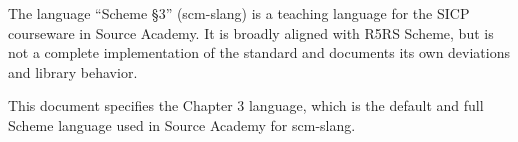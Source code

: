 The language ``Scheme \S 3'' (scm-slang) is a teaching language for the SICP
courseware in Source Academy. It is broadly aligned with R5RS Scheme, but is
not a complete implementation of the standard and documents its own deviations
and library behavior.

This document specifies the Chapter 3 language, which is the default and full
Scheme language used in Source Academy for scm-slang.
